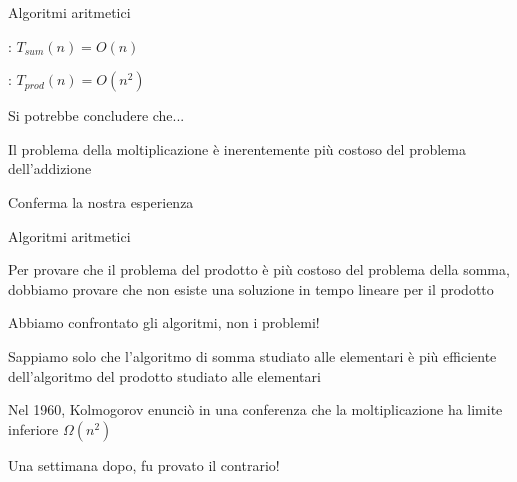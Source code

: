 \begin{frame}{Algoritmi aritmetici}

\vspace{-9pt}
\begin{myboxtitle}
\BI
\item {}: $T_{sum}(n) = O(n)$
\item {}: $T_{prod}(n) = O(n^2)$
\EI
\end{myboxtitle}

\bigskip
Si potrebbe concludere che...
\BI
\item Il problema della moltiplicazione è inerentemente più costoso del problema dell'addizione
\item Conferma la nostra esperienza
\EI

\end{frame}

\begin{frame}{Algoritmi aritmetici}

\vspace{-9pt}
\begin{myboxtitle}
Per provare che il problema del prodotto è più costoso del problema della somma, dobbiamo provare che \alert{non esiste} una soluzione in tempo lineare per il prodotto
\end{myboxtitle}

\bigskip
Abbiamo confrontato gli algoritmi, non i problemi!
\BI
\item Sappiamo solo che l'algoritmo di somma studiato alle elementari è più efficiente dell'algoritmo del prodotto studiato alle elementari
\item Nel 1960, Kolmogorov enunciò in una conferenza che la moltiplicazione ha limite inferiore $\Omega(n^2)$
\item Una settimana dopo, fu provato il contrario!
\EI

\end{frame}

